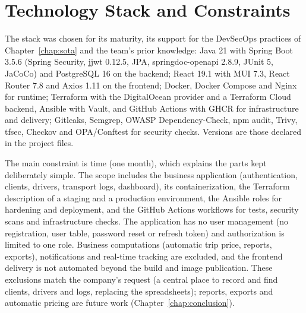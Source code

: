 \section{Technology Stack and Constraints}

The stack was chosen for its maturity, its support for the DevSecOps practices of Chapter~\ref{chap:sota} and the team's prior knowledge: Java 21 with Spring Boot 3.5.6 (Spring Security, jjwt 0.12.5, JPA, springdoc-openapi 2.8.9, JUnit 5, JaCoCo) and PostgreSQL 16 on the backend; React 19.1 with MUI 7.3, React Router 7.8 and Axios 1.11 on the frontend; Docker, Docker Compose and Nginx for runtime; Terraform with the DigitalOcean provider and a Terraform Cloud backend, Ansible with Vault, and GitHub Actions with GHCR for infrastructure and delivery; Gitleaks, Semgrep, OWASP Dependency-Check, npm audit, Trivy, tfsec, Checkov and OPA/Conftest for security checks. Versions are those declared in the project files.

The main constraint is time (one month), which explains the parts kept deliberately simple. The scope includes the business application (authentication, clients, drivers, transport logs, dashboard), its containerization, the Terraform description of a staging and a production environment, the Ansible roles for hardening and deployment, and the GitHub Actions workflows for tests, security scans and infrastructure checks. The application has no user management (no registration, user table, password reset or refresh token) and authorization is limited to one role. Business computations (automatic trip price, reports, exports), notifications and real-time tracking are excluded, and the frontend delivery is not automated beyond the build and image publication. These exclusions match the company's request (a central place to record and find clients, drivers and logs, replacing the spreadsheets); reports, exports and automatic pricing are future work (Chapter~\ref{chap:conclusion}).
